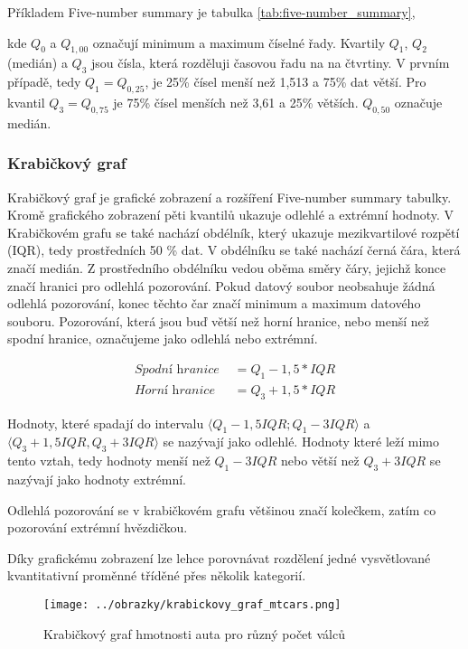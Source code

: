 Příkladem Five-number summary je tabulka \ref{tab:five-number_summary},

kde $Q_{0}$ a $Q_{1,00}$ označují minimum a maximum číselné řady. Kvartily $Q_{1}$, $Q_{2}$ (medián) a $Q_{3}$ jsou čísla, která rozděluji časovou řadu na na čtvrtiny. V prvním
případě, tedy $Q_1 = Q_{0,25}$, je 25\% čísel menší než 1,513 a 75\% dat větší. Pro kvantil $Q_3 = Q_{0,75}$ je 75\% čísel menších než 3,61 a 25\% větších. $Q_{0,50}$ označuje medián.

\subsubsection{Krabičkový graf}
Krabičkový graf je grafické zobrazení a rozšíření Five-number summary tabulky. Kromě grafického zobrazení 
pěti kvantilů  ukazuje odlehlé a extrémní hodnoty.
V Krabičkovém grafu se také nachází obdélník, který ukazuje mezikvartilové rozpětí (IQR), tedy prostředních 50 \% dat. V obdélníku se také nachází černá čára, která značí medián.
Z prostředního obdélníku vedou oběma směry čáry, jejichž konce značí hranici pro odlehlá pozorování. Pokud datový soubor neobsahuje žádná odlehlá pozorování, konec těchto čar
značí minimum a maximum datového souboru.
Pozorování, která jsou buď větší než horní hranice, nebo menší než spodní hranice, označujeme jako odlehlá nebo extrémní. 

\begin{align*}
    \textit{Spodní hranice } &= Q_1 - 1,5 * IQR \\
    \textit{Horní hranice } &= Q_3 + 1,5 * IQR
\end{align*}

Hodnoty, které spadají do intervalu $\langle Q_1 - 1,5IQR; Q_1 - 3IQR\rangle$ a $\langle Q_3 + 1,5IQR, Q_3 + 3IQR \rangle$ se nazývají jako odlehlé.
Hodnoty které leží mimo tento vztah, tedy hodnoty menší než $Q_1 - 3IQR$ nebo větší než $Q_3 + 3IQR$ se nazývají jako hodnoty extrémní.

Odlehlá pozorování se v krabičkovém grafu většinou značí kolečkem, zatím co pozorování extrémní hvězdičkou.

Díky grafickému zobrazení lze lehce porovnávat rozdělení jedné vysvětlované kvantitativní proměnné tříděné přes několik kategorií.

\begin{figure}[H]
    \centering
    \texttt{[image: ../obrazky/krabickovy\_graf\_mtcars.png]}
    \caption{Krabičkový graf hmotnosti auta pro různý počet válců} 
    \label{fig:krabickovy_graf_mtcars}
\end{figure}

